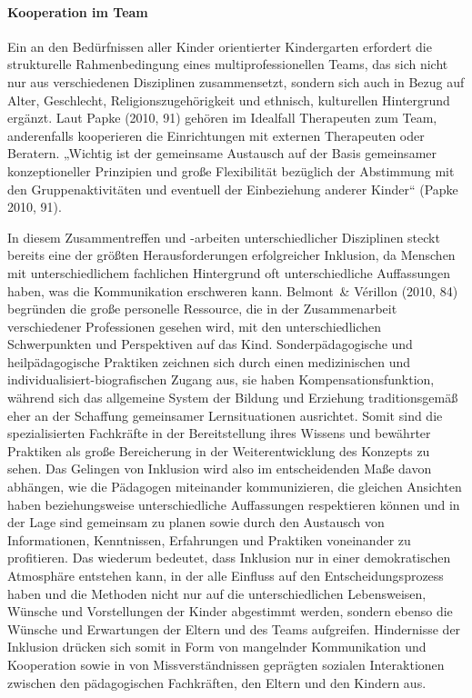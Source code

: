 \paragraph{Kooperation im Team}\label{Team}

Ein an den Bedürfnissen aller Kinder orientierter Kindergarten erfordert die strukturelle Rahmenbedingung eines multiprofessionellen Teams, das sich nicht nur aus verschiedenen Disziplinen zusammensetzt, sondern sich auch in Bezug auf Alter, Geschlecht, Religionszugehörigkeit und ethnisch, kulturellen Hintergrund ergänzt.
Laut Papke (2010, 91) gehören im Idealfall Therapeuten zum Team, anderenfalls kooperieren die Einrichtungen mit externen Therapeuten oder Beratern. „Wichtig ist der gemeinsame Austausch auf der Basis gemeinsamer konzeptioneller Prinzipien und große Flexibilität bezüglich der Abstimmung mit den Gruppenaktivitäten und eventuell der Einbeziehung anderer Kinder“ (Papke 2010, 91).

In diesem Zusammentreffen und -arbeiten unterschiedlicher Disziplinen steckt bereits eine der größten Herausforderungen erfolgreicher Inklusion, da Menschen mit unterschiedlichem fachlichen Hintergrund  oft unterschiedliche Auffassungen haben, was die Kommunikation erschweren kann. 
Belmont~\& Vérillon (2010, 84) begründen die große personelle Ressource, die in der Zusammenarbeit verschiedener Professionen  gesehen wird, mit den unterschiedlichen Schwerpunkten und Perspektiven auf das Kind. Sonderpädagogische und heilpädagogische Praktiken zeichnen sich durch einen medizinischen und individualisiert-biografischen Zugang aus, sie haben Kompensationsfunktion, während sich das allgemeine System der Bildung und Erziehung traditionsgemäß eher an der Schaffung gemeinsamer Lernsituationen ausrichtet. Somit sind die spezialisierten Fachkräfte in der Bereitstellung ihres Wissens und bewährter Praktiken als große Bereicherung in der Weiterentwicklung des Konzepts zu sehen.
Das Gelingen von Inklusion wird also im entscheidenden Maße davon abhängen, wie die Pädagogen miteinander kommunizieren, die gleichen Ansichten haben beziehungsweise unterschiedliche Auffassungen respektieren können und in der Lage sind gemeinsam zu planen sowie durch den Austausch von Informationen, Kenntnissen, Erfahrungen und Praktiken voneinander zu profitieren. Das wiederum bedeutet, dass Inklusion nur in einer demokratischen Atmosphäre entstehen kann, in der alle Einfluss auf den Entscheidungsprozess haben und die Methoden nicht nur auf die unterschiedlichen Lebensweisen, Wünsche und Vorstellungen der Kinder abgestimmt werden, sondern ebenso die Wünsche und Erwartungen der Eltern und des Teams aufgreifen.
Hindernisse der Inklusion drücken sich somit in Form von mangelnder Kommunikation und Kooperation sowie in von Missverständnissen geprägten sozialen Interaktionen zwischen den pädagogischen Fachkräften, den Eltern und den Kindern aus.

